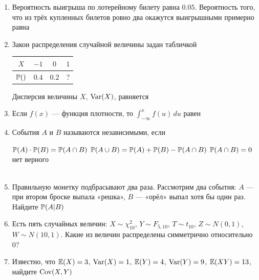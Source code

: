 \documentclass[12pt, a4paper]{article}\usepackage[]{graphicx}\usepackage[]{color}
\begin{document}
\begin{enumerate}


\item Вероятность выигрыша по лотерейному билету равна $0.05$. Вероятность того, что из трёх купленных билетов ровно два окажутся выигрышными примерно равна


\item Закон распределения случайной величины задан табличкой

\begin{tabular}{c|ccc}
$X$ & $-1$ & $0$ & $1$ \\
\hline
$\P()$ & $0.4$ & $0.2$ & $?$ \\
\end{tabular}

Дисперсия величины $X$, $\Var(X)$, равняется


\item Если $f(x)$ — функция плотности, то $\int_{-\infty}^{x}f(u)\,du$ равен


\item События $A$ и $B$ называются независимыми, если

{$\P(A)\cdot\P(B)=\P(A\cap B)$}
{$\P(A\cup B)=\P(A)+\P(B)-\P(A\cap B)$}
{$\P(A\cap B)=0$}
{нет верного} \\ \\

\item Правильную монетку подбрасывают два раза. Рассмотрим два события: $A$ — при втором броске выпала «решка», $B$ — «орёл» выпал хотя бы один раз. Найдите $\P(A|B)$


\item Есть пять случайных величин: $X\sim \chi^2_{10}$, $Y\sim F_{5,10}$, $T\sim t_{10}$, $Z\sim N(0,1)$, $W\sim N(10,1)$. Какие из величин распределены симметрично относительно 0?


\item Известно, что $\E(X)=3$, $\Var(X)=1$, $\E(Y)=4$, $\Var(Y)=9$, $\E(XY)=13$, найдите $\Cov(X,Y)$



\end{enumerate}
\end{document}
